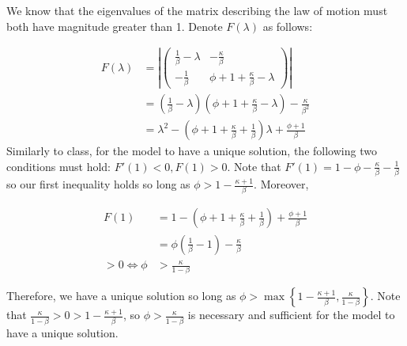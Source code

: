 \documentclass[11pt]{article} %
\begin{document}
We know that the eigenvalues of the matrix describing the law of motion must both have magnitude greater than 1. Denote $F(\lambda)$ as follows:

\begin{align*}
F(\lambda)  &= \left|  \begin{pmatrix} \frac{1}{\beta} - \lambda &  -\frac{\kappa }{\beta}  \\ -\frac{1}{\beta}  & \phi + 1 + \frac{\kappa}{\beta} - \lambda  \end{pmatrix} \right|\\
&= \left(  \frac{1 }{\beta} - \lambda \right) \left( \phi + 1 + \frac{\kappa}{\beta} - \lambda \right) - \frac{\kappa}{\beta^2} \\
&= \lambda^2 - \left( \phi + 1 + \frac{\kappa}{\beta} + \frac{1}{\beta}\right)\lambda + \frac{ \phi + 1 }{\beta}
\end{align*}
 Similarly to class, for the model to have a unique solution, the following two conditions must hold: $F'(1)<0, F(1) > 0$. Note that $F'(1)  = 1  - \phi - \frac{\kappa}{\beta} - \frac{1}{\beta} $ so our first inequality holds so long as $\phi>1 - \frac{\kappa + 1}{\beta}$. Moreover,

\begin{align*}
F(1) &=  1 - \left(\phi + 1 + \frac{\kappa}{\beta} + \frac{1}{\beta}\right) + \frac{ \phi + 1 }{\beta} \\
&= \phi \left( \frac{1}{\beta} - 1\right) - \frac{\kappa}{\beta}\\
>0 \iff \phi &> \frac{\kappa}{1-\beta}
\end{align*}

Therefore, we have a unique solution so long as $\phi > \max\left\{ 1 - \frac{\kappa + 1}{\beta} ,  \frac{\kappa}{1-\beta}\right\}$. Note that $\frac{\kappa}{1-\beta} >0 > 1 - \frac{\kappa + 1}{\beta}  $, so $\phi> \frac{\kappa}{1-\beta}$  is necessary and sufficient for the model to have a unique solution.
\end{document}
